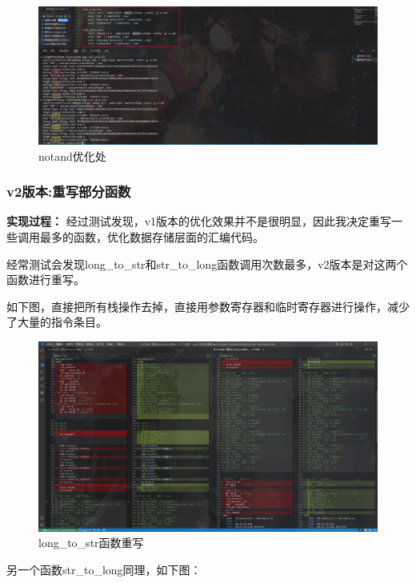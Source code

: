 \documentclass[12pt,hyperref,a4paper,UTF8]{ctexart}
\begin{document}
  \begin{figure}[H]
      \centering
      \includegraphics[width =1.0\textwidth]{figures/fig/image21.png}
      \caption{notand优化处}
  \end{figure}

  \newpage
\subsubsection{v2版本:重写部分函数}
\textbf{实现过程：}
经过测试发现，v1版本的优化效果并不是很明显，因此我决定重写一些调用最多的函数，优化数据存储层面的汇编代码。

经常测试会发现long\_to\_str和str\_to\_long函数调用次数最多，v2版本是对这两个函数进行重写。

如下图，直接把所有栈操作去掉，直接用参数寄存器和临时寄存器进行操作，减少了大量的指令条目。
  \begin{figure}[H]
      \centering
      \includegraphics[width =1.0\textwidth]{figures/fig/image22.png}
      \caption{long\_to\_str函数重写}
  \end{figure}

另一个函数str\_to\_long同理，如下图：
\end{document}
